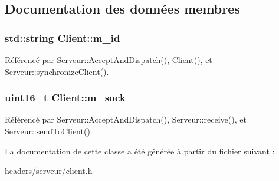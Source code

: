 \subsection{Documentation des données membres}
\hypertarget{classClient_af29655fb85148cf9cff9c94af770c023}{
\subsubsection[{m\-\_\-id}]{\setlength{\rightskip}{0pt plus 5cm}std\-::string Client\-::m\-\_\-id}}\label{classClient_af29655fb85148cf9cff9c94af770c023}


Référencé par Serveur\-::\-Accept\-And\-Dispatch(), Client(), et Serveur\-::synchronize\-Client().

\hypertarget{classClient_a80564d281c880f1e80b6e1b54ae6e71e}{
\subsubsection[{m\-\_\-sock}]{\setlength{\rightskip}{0pt plus 5cm}uint16\-\_\-t Client\-::m\-\_\-sock}}\label{classClient_a80564d281c880f1e80b6e1b54ae6e71e}


Référencé par Serveur\-::\-Accept\-And\-Dispatch(), Serveur\-::receive(), et Serveur\-::send\-To\-Client().



La documentation de cette classe a été générée à partir du fichier suivant \-:\begin{DoxyCompactItemize}
\item 
headers/serveur/\hyperlink{client_8h}{client.\-h}\end{DoxyCompactItemize}

